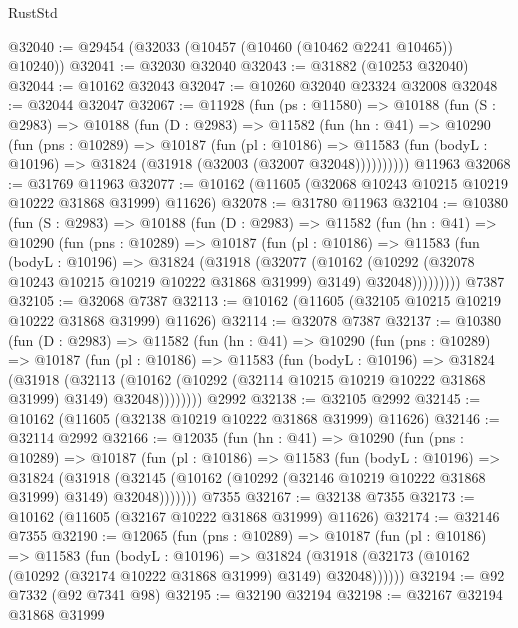 \begin{lexlean}{RustStd}
\begin{coremodule}
@32040 := @29454 (@32033 (@10457 (@10460 (@10462 @2241 @10465)) @10240))
@32041 := @32030 @32040
@32043 := @31882 (@10253 @32040)
@32044 := @10162 @32043
@32047 := @10260 @32040 @23324 @32008
@32048 := @32044 @32047
@32067 := @11928
    (fun (ps : @11580) =>
    @10188
      (fun (S : @2983) =>
      @10188
        (fun (D : @2983) =>
        @11582
          (fun (hn : @41) =>
          @10290
            (fun (pns : @10289) =>
            @10187
              (fun (pl : @10186) =>
              @11583 (fun (bodyL : @10196) => @31824 (@31918 (@32003 (@32007 @32048))))))))))
    @11963
@32068 := @31769 @11963
@32077 := @10162 (@11605 (@32068 @10243 @10215 @10219 @10222 @31868 @31999) @11626)
@32078 := @31780 @11963
@32104 := @10380
    (fun (S : @2983) =>
    @10188
      (fun (D : @2983) =>
      @11582
        (fun (hn : @41) =>
        @10290
          (fun (pns : @10289) =>
          @10187
            (fun (pl : @10186) =>
            @11583
              (fun (bodyL : @10196) =>
              @31824
                (@31918
                  (@32077
                    (@10162
                      (@10292 (@32078 @10243 @10215 @10219 @10222 @31868 @31999) @3149)
                      @32048)))))))))
    @7387
@32105 := @32068 @7387
@32113 := @10162 (@11605 (@32105 @10215 @10219 @10222 @31868 @31999) @11626)
@32114 := @32078 @7387
@32137 := @10380
    (fun (D : @2983) =>
    @11582
      (fun (hn : @41) =>
      @10290
        (fun (pns : @10289) =>
        @10187
          (fun (pl : @10186) =>
          @11583
            (fun (bodyL : @10196) =>
            @31824
              (@31918
                (@32113
                  (@10162 (@10292 (@32114 @10215 @10219 @10222 @31868 @31999) @3149) @32048))))))))
    @2992
@32138 := @32105 @2992
@32145 := @10162 (@11605 (@32138 @10219 @10222 @31868 @31999) @11626)
@32146 := @32114 @2992
@32166 := @12035
    (fun (hn : @41) =>
    @10290
      (fun (pns : @10289) =>
      @10187
        (fun (pl : @10186) =>
        @11583
          (fun (bodyL : @10196) =>
          @31824
            (@31918
              (@32145 (@10162 (@10292 (@32146 @10219 @10222 @31868 @31999) @3149) @32048)))))))
    @7355
@32167 := @32138 @7355
@32173 := @10162 (@11605 (@32167 @10222 @31868 @31999) @11626)
@32174 := @32146 @7355
@32190 := @12065
    (fun (pns : @10289) =>
    @10187
      (fun (pl : @10186) =>
      @11583
        (fun (bodyL : @10196) =>
        @31824 (@31918 (@32173 (@10162 (@10292 (@32174 @10222 @31868 @31999) @3149) @32048))))))
@32194 := @92 @7332 (@92 @7341 @98)
@32195 := @32190 @32194
@32198 := @32167 @32194 @31868 @31999

\end{coremodule}
\end{lexlean}
